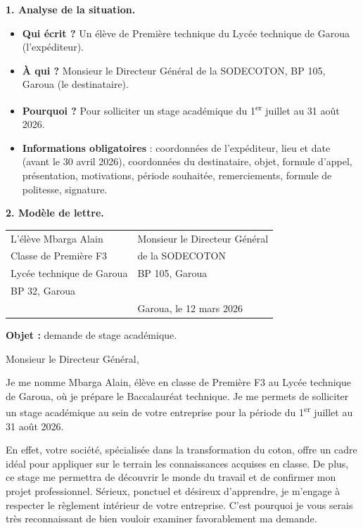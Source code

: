 \documentclass[11pt]{article}
\begin{document}
\begin{corrige}
\textbf{1. Analyse de la situation.}
\begin{itemize}
\item \textbf{Qui écrit ?} Un élève de Première technique du Lycée technique de Garoua (l'expéditeur).
\item \textbf{À qui ?} Monsieur le Directeur Général de la SODECOTON, BP 105, Garoua (le destinataire).
\item \textbf{Pourquoi ?} Pour solliciter un stage académique du 1\textsuperscript{er} juillet au 31 août 2026.
\item \textbf{Informations obligatoires} : coordonnées de l'expéditeur, lieu et date (avant le 30 avril 2026), coordonnées du destinataire, objet, formule d'appel, présentation, motivations, période souhaitée, remerciements, formule de politesse, signature.
\end{itemize}

\textbf{2. Modèle de lettre.}

\begin{center}
\begin{tabularx}{\linewidth}{X X}
L'élève Mbarga Alain & Monsieur le Directeur Général \\
Classe de Première F3 & de la SODECOTON \\
Lycée technique de Garoua & BP 105, Garoua \\
BP 32, Garoua & \\
& Garoua, le 12 mars 2026 \\
\end{tabularx}
\end{center}

\textbf{Objet :} demande de stage académique.

Monsieur le Directeur Général,

Je me nomme Mbarga Alain, élève en classe de Première F3 au Lycée technique de Garoua, où je prépare le Baccalauréat technique. Je me permets de solliciter un stage académique au sein de votre entreprise pour la période du 1\textsuperscript{er} juillet au 31 août 2026.

En effet, votre société, spécialisée dans la transformation du coton, offre un cadre idéal pour appliquer sur le terrain les connaissances acquises en classe. De plus, ce stage me permettra de découvrir le monde du travail et de confirmer mon projet professionnel. Sérieux, ponctuel et désireux d'apprendre, je m'engage à respecter le règlement intérieur de votre entreprise. C'est pourquoi je vous serais très reconnaissant de bien vouloir examiner favorablement ma demande.


\end{corrige}
\end{document}
